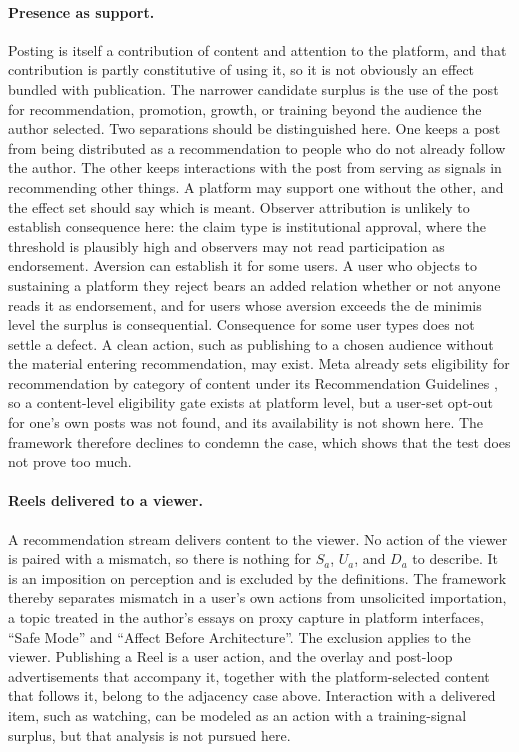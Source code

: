\paragraph{Presence as support.} Posting is itself a contribution of content and attention to the platform, and that contribution is partly constitutive of using it, so it is not obviously an effect bundled with publication. The narrower candidate surplus is the use of the post for recommendation, promotion, growth, or training beyond the audience the author selected. Two separations should be distinguished here. One keeps a post from being distributed as a recommendation to people who do not already follow the author. The other keeps interactions with the post from serving as signals in recommending other things. A platform may support one without the other, and the effect set should say which is meant. Observer attribution is unlikely to establish consequence here: the claim type is institutional approval, where the threshold is plausibly high and observers may not read participation as endorsement. Aversion can establish it for some users. A user who objects to sustaining a platform they reject bears an added relation whether or not anyone reads it as endorsement, and for users whose aversion exceeds the de minimis level the surplus is consequential. Consequence for some user types does not settle a defect. A clean action, such as publishing to a chosen audience without the material entering recommendation, may exist. Meta already sets eligibility for recommendation by category of content under its Recommendation Guidelines \cite{fb-recs}, so a content-level eligibility gate exists at platform level, but a user-set opt-out for one's own posts was not found, and its availability is not shown here. The framework therefore declines to condemn the case, which shows that the test does not prove too much.

\paragraph{Reels delivered to a viewer.} A recommendation stream delivers content to the viewer. No action of the viewer is paired with a mismatch, so there is nothing for $S_a$, $U_a$, and $D_a$ to describe. It is an imposition on perception and is excluded by the definitions. The framework thereby separates mismatch in a user's own actions from unsolicited importation, a topic treated in the author's essays on proxy capture in platform interfaces, ``Safe Mode'' and ``Affect Before Architecture''. The exclusion applies to the viewer. Publishing a Reel is a user action, and the overlay and post-loop advertisements that accompany it, together with the platform-selected content that follows it, belong to the adjacency case above. Interaction with a delivered item, such as watching, can be modeled as an action with a training-signal surplus, but that analysis is not pursued here.

